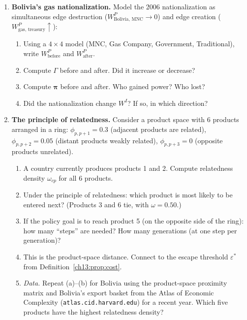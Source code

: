 \documentclass[../structural_economics_book.tex]{subfiles}
\begin{document}
\begin{enumerate}[label=\textbf{13.\arabic*}, leftmargin=3em]
\item \textbf{Bolivia's gas nationalization.} Model the 2006 nationalization as simultaneous edge destruction ($W^P_{\text{Bolivia, MNC}} \to 0$) and edge creation ($W^P_{\text{gas, treasury}} \uparrow$):
\begin{enumerate}
\item Using a $4 \times 4$ model (MNC, Gas Company, Government, Traditional), write $W^P_{\text{before}}$ and $W^P_{\text{after}}$.
\item Compute $\Gamma$ before and after. Did it increase or decrease?
\item Compute $\boldsymbol{\pi}$ before and after. Who gained power? Who lost?
\item Did the nationalization change $W^I$? If so, in which direction?
\end{enumerate}

\item \textbf{The principle of relatedness.} Consider a product space with 6 products arranged in a ring: $\phi_{p,p+1} = 0.3$ (adjacent products are related), $\phi_{p,p+2} = 0.05$ (distant products weakly related), $\phi_{p,p+3} = 0$ (opposite products unrelated).
\begin{enumerate}
\item A country currently produces products 1 and 2. Compute relatedness density $\omega_{cp}$ for all 6 products.
\item Under the principle of relatedness: which product is most likely to be entered next? (Products 3 and 6 tie, with $\omega = 0.50$.)
\item If the policy goal is to reach product 5 (on the opposite side of the ring): how many ``steps'' are needed? How many generations (at one step per generation)?
\item This is the product-space distance. Connect to the escape threshold $\varepsilon^*$ from Definition~\ref{ch13:prop:cost}.
\item \textit{Data.} Repeat (a)--(b) for Bolivia using the product-space proximity matrix and Bolivia's export basket from the Atlas of Economic Complexity (\texttt{atlas.cid.harvard.edu}) for a recent year. Which five products have the highest relatedness density?
\end{enumerate}


\end{enumerate}
\end{document}
